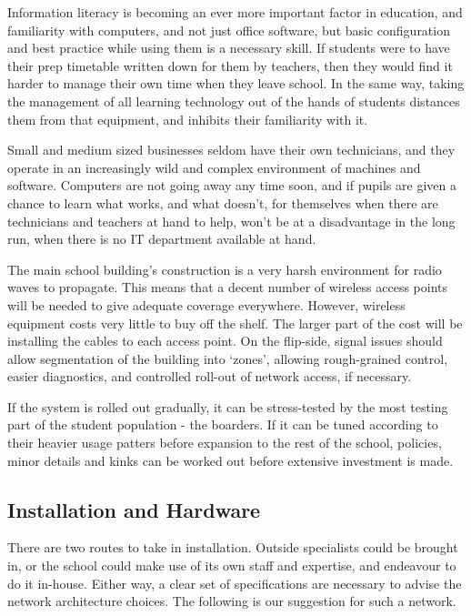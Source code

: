 \documentclass[a4paper,leqno,titlepage]{article}
\begin{document}
Information literacy is becoming an ever more important factor in education,
and familiarity with computers, and not just office software, but basic
configuration and best practice while using them is a necessary skill.
If students were to have their prep timetable written down for them by teachers,
then they would find it harder to manage their own time when they leave school.
In the same way, taking the management of all learning technology out of the
hands of students distances them from that equipment, and inhibits their
familiarity with it.


Small and medium sized businesses seldom have their own
technicians, and they operate in an increasingly wild and complex environment
of machines and software.
Computers are not going away any time soon, and if pupils
are given a chance to learn what works, and what doesn't, for themselves when
there are technicians and teachers at hand to help,
won't be at a disadvantage in the long run, when there is no IT department
available at hand.

The main school building's construction is a very harsh environment for radio
waves to propagate. This means that a decent number of wireless access points
will be needed to give adequate coverage everywhere. However, wireless equipment
costs very little to buy off the shelf. The larger part of the cost will be
installing the cables to each access point.
On the flip-side, signal issues should allow segmentation of the building
into `zones', allowing rough-grained control, easier diagnostics, and
controlled roll-out of network access, if necessary.


If the system is rolled out gradually, it can be
stress-tested by the most testing part of the student population - the boarders.
If it can be tuned according to their heavier usage patters before expansion to
the rest of the school, policies, minor details and kinks can be worked out
before extensive investment is made.


\subsection{Installation and Hardware}

There are two routes to take in installation.
Outside specialists could be brought in, or the
school could make use of its own staff and expertise,
and endeavour to do it in-house.
Either way, a clear set of specifications are necessary to advise the network
architecture choices. The following is our suggestion for such a network.
\end{document}
